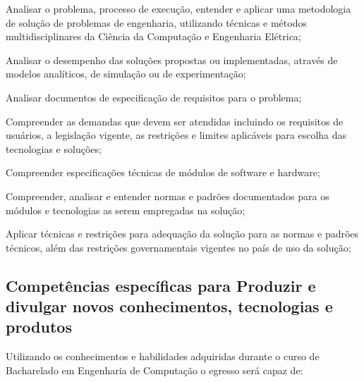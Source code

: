 \begin{compitem}
    \item Analisar o problema, processo de execução, entender e aplicar uma metodologia de solução de problemas de engenharia, utilizando técnicas e métodos multidisciplinares da Ciência da Computação e Engenharia Elétrica;
    \item Analisar o desempenho das soluções propostas ou implementadas, através de modelos analíticos, de simulação ou de experimentação;
    \item Analisar documentos de especificação de requisitos para o problema;
    \item Compreender as demandas que devem ser atendidas incluindo os requisitos de usuários, a legislação vigente, as restrições e limites aplicáveis para escolha das tecnologias e soluções;
    \item Compreender especificações técnicas de módulos de software e hardware;
    \item Compreender, analisar e entender normas e padrões documentados para os módulos e tecnologias as serem empregadas na solução;
    \item Aplicar técnicas e restrições para adequação da solução para as normas e padrões técnicos, além das restrições governamentais vigentes no país de uso da solução;
\end{compitem}

\subsection*{Competências específicas para Produzir e divulgar novos conhecimentos, tecnologias e produtos}

Utilizando os conhecimentos e habilidades adquiridas durante o curso de Bacharelado em Engenharia de Computação o egresso será capaz de:

